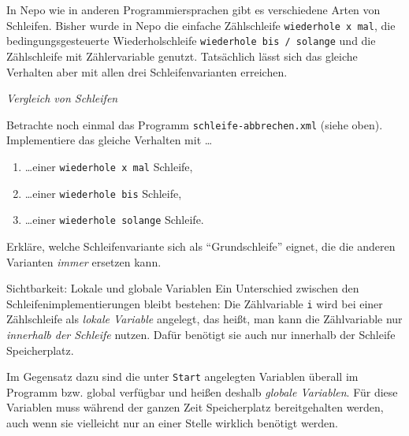 \bigskip
In Nepo wie in anderen Programmiersprachen gibt es verschiedene Arten von Schleifen. Bisher wurde in Nepo die einfache Zählschleife \texttt{wiederhole x mal}, die bedingungsgesteuerte Wiederholschleife \texttt{wiederhole bis / solange} und die Zählschleife mit Zählervariable genutzt. Tatsächlich lässt sich das gleiche Verhalten aber mit allen drei Schleifenvarianten erreichen.

\begin{aufgabe} \emph{Vergleich von Schleifen}
	
	Betrachte noch einmal das Programm \texttt{schleife-abbrechen.xml} (siehe oben). Implementiere das gleiche Verhalten mit \dots
	\begin{enumerate}[label=\alph*), itemsep=0ex, parsep=0ex]
		\item \dots einer \texttt{wiederhole x mal} Schleife,
		\item \dots einer \texttt{wiederhole bis} Schleife,
		\item \dots einer \texttt{wiederhole solange} Schleife.
	\end{enumerate}

	Erkläre, welche Schleifenvariante sich als \enquote{Grundschleife} eignet, die die anderen Varianten \emph{immer} ersetzen kann.
\end{aufgabe}

\newpage
\begin{zsfg}{Sichtbarkeit: Lokale und globale Variablen}
	Ein Unterschied zwischen den Schleifenimplementierungen bleibt bestehen: Die Zählvariable \texttt{i} wird bei einer Zählschleife als \emph{lokale Variable} angelegt, das heißt, man kann die Zählvariable nur \emph{innerhalb der Schleife} nutzen. Dafür benötigt sie auch nur innerhalb der Schleife Speicherplatz.
	
	Im Gegensatz dazu sind die unter \texttt{Start} angelegten Variablen überall im Programm bzw. global verfügbar und heißen deshalb \emph{globale Variablen}. Für diese Variablen muss während der ganzen Zeit Speicherplatz bereitgehalten werden, auch wenn sie vielleicht nur an einer Stelle wirklich benötigt werden.
\end{zsfg}

